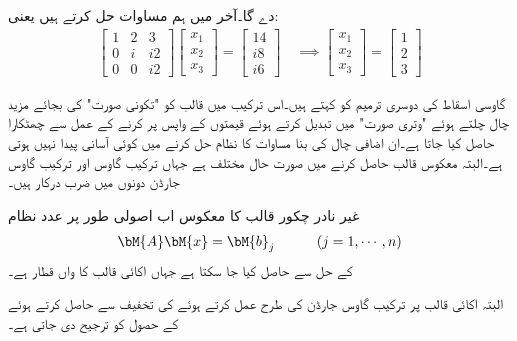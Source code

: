 دے گا۔آخر میں ہم مساوات  حل کرتے ہیں یعنی:
\begin{align*}
\begin{bmatrix}
1&2&3\\
0&i&i2\\
0&0&i2
\end{bmatrix}
\begin{bmatrix}
x_1\\
x_2\\
x_3
\end{bmatrix}=
\begin{bmatrix}
14\\
i8\\
i6
\end{bmatrix}\quad\implies
\begin{bmatrix}
x_1\\
x_2\\
x_3
\end{bmatrix}=
\begin{bmatrix}
1\\
2\\
3
\end{bmatrix}
\end{align*}


گاوسی اسقاط کی دوسری ترمیم کو  کہتے ہیں۔اس ترکیب میں قالب کو "تکونی صورت" کی بجائے مزید چال چلتے ہوئے  "وتری صورت" میں تبدیل کرتے ہوئے قیمتوں کے واپس پر کرنے کے عمل سے چھٹکارا حاصل کیا جاتا ہے۔ان اضافی چال کی بنا مساوات کا نظام حل کرنے میں کوئی آسانی پیدا نہیں ہوتی ہے۔البتہ معکوس قالب حاصل کرنے میں صورت حال مختلف ہے جہاں ترکیب گاوس اور ترکیب گاوس جارڈن دونوں میں  ضرب درکار ہیں۔

غیر نادر چکور قالب  کا معکوس اب اصولی طور پر  عدد نظام
\begin{align}\label{مساوات_خطی_اعدادی_شولسکی_ٹ}
\bM{A}\bM{x}=\bM{b}_j\quad \quad \quad (j=1,\cdots,n)
\end{align}
کے حل سے حاصل کیا جا سکتا ہے جہاں  اکائی قالب کا  واں قطار  ہے۔

البتہ اکائی قالب  پر ترکیب گاوس جارڈن کی طرح عمل کرتے ہوئے  کی تخفیف سے   حاصل کرتے ہوئے  کے حصول کو ترجیح دی جاتی ہے۔

